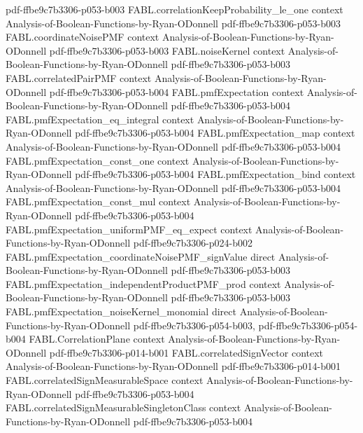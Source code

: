 \begin{theorem}
  {pdf-ffbe9c7b3306-p053-b003}
\proofstep
  {FABL.correlationKeepProbability_le_one}
  {context}
  {Analysis-of-Boolean-Functions-by-Ryan-ODonnell}
  {pdf-ffbe9c7b3306-p053-b003}
\proofstep
  {FABL.coordinateNoisePMF}
  {context}
  {Analysis-of-Boolean-Functions-by-Ryan-ODonnell}
  {pdf-ffbe9c7b3306-p053-b003}
\proofstep
  {FABL.noiseKernel}
  {context}
  {Analysis-of-Boolean-Functions-by-Ryan-ODonnell}
  {pdf-ffbe9c7b3306-p053-b003}
\proofstep
  {FABL.correlatedPairPMF}
  {context}
  {Analysis-of-Boolean-Functions-by-Ryan-ODonnell}
  {pdf-ffbe9c7b3306-p053-b004}
\proofstep
  {FABL.pmfExpectation}
  {context}
  {Analysis-of-Boolean-Functions-by-Ryan-ODonnell}
  {pdf-ffbe9c7b3306-p053-b004}
\proofstep
  {FABL.pmfExpectation_eq_integral}
  {context}
  {Analysis-of-Boolean-Functions-by-Ryan-ODonnell}
  {pdf-ffbe9c7b3306-p053-b004}
\proofstep
  {FABL.pmfExpectation_map}
  {context}
  {Analysis-of-Boolean-Functions-by-Ryan-ODonnell}
  {pdf-ffbe9c7b3306-p053-b004}
\proofstep
  {FABL.pmfExpectation_const_one}
  {context}
  {Analysis-of-Boolean-Functions-by-Ryan-ODonnell}
  {pdf-ffbe9c7b3306-p053-b004}
\proofstep
  {FABL.pmfExpectation_bind}
  {context}
  {Analysis-of-Boolean-Functions-by-Ryan-ODonnell}
  {pdf-ffbe9c7b3306-p053-b004}
\proofstep
  {FABL.pmfExpectation_const_mul}
  {context}
  {Analysis-of-Boolean-Functions-by-Ryan-ODonnell}
  {pdf-ffbe9c7b3306-p053-b004}
\proofstep
  {FABL.pmfExpectation_uniformPMF_eq_expect}
  {context}
  {Analysis-of-Boolean-Functions-by-Ryan-ODonnell}
  {pdf-ffbe9c7b3306-p024-b002}
\proofstep
  {FABL.pmfExpectation_coordinateNoisePMF_signValue}
  {direct}
  {Analysis-of-Boolean-Functions-by-Ryan-ODonnell}
  {pdf-ffbe9c7b3306-p053-b003}
\proofstep
  {FABL.pmfExpectation_independentProductPMF_prod}
  {context}
  {Analysis-of-Boolean-Functions-by-Ryan-ODonnell}
  {pdf-ffbe9c7b3306-p053-b003}
\proofstep
  {FABL.pmfExpectation_noiseKernel_monomial}
  {direct}
  {Analysis-of-Boolean-Functions-by-Ryan-ODonnell}
  {pdf-ffbe9c7b3306-p054-b003,
    pdf-ffbe9c7b3306-p054-b004}
\proofstep
  {FABL.CorrelationPlane}
  {context}
  {Analysis-of-Boolean-Functions-by-Ryan-ODonnell}
  {pdf-ffbe9c7b3306-p014-b001}
\proofstep
  {FABL.correlatedSignVector}
  {context}
  {Analysis-of-Boolean-Functions-by-Ryan-ODonnell}
  {pdf-ffbe9c7b3306-p014-b001}
\proofstep
  {FABL.correlatedSignMeasurableSpace}
  {context}
  {Analysis-of-Boolean-Functions-by-Ryan-ODonnell}
  {pdf-ffbe9c7b3306-p053-b004}
\proofstep
  {FABL.correlatedSignMeasurableSingletonClass}
  {context}
  {Analysis-of-Boolean-Functions-by-Ryan-ODonnell}
  {pdf-ffbe9c7b3306-p053-b004}
\proofstep

\end{theorem}
